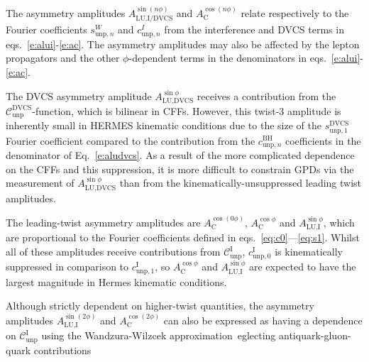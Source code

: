 The asymmetry amplitudes $A_{\textrm{LU,I/DVCS}}^{\sin(n\phi)}$ and
$A_{\textrm{C}}^{\cos(n\phi)}$ relate respectively to the Fourier
coefficients $s_{\textrm{unp},n}^{W}$ and $c_{\textrm{unp},n}^{I}$ from the interference and DVCS terms in eqs.~\ref{e:alui}-\ref{e:ac}. The asymmetry amplitudes
may also be affected by the lepton propagators and the other
$\phi$-dependent terms in the denominators in
eqs.~\ref{e:alui}-\ref{e:ac}.

The DVCS asymmetry amplitude $A^{\sin\phi}_{\textrm{LU,DVCS}}$ receives a
contribution from the $\mathcal{C}_{\textrm{unp}}^{\textrm{DVCS}}$-function,
which is bilinear in CFFs. However, this twist-3 amplitude is inherently small in HERMES kinematic conditions due to the size of the $s_{\textrm{unp},1}^{\textrm{DVCS}}$ Fourier coefficient compared to the contribution from the $c_{\textrm{unp},n}^{\textrm{BH}}$ coefficients in the denominator of Eq.~\ref{e:aludvcs}. As a result of the more complicated dependence on the CFFs and this suppression, it
is more difficult to constrain GPDs via the measurement of $A^{\sin\phi}_{\textrm{LU,DVCS}}$ than from the kinematically-unsuppressed leading twist amplitudes.

The leading-twist asymmetry amplitudes are $A_{\textrm{C}}^{\cos(0\phi)}$, $A_{\textrm{C}}^{\cos\phi}$ and $A_{\textrm{LU,I}}^{\sin\phi}$, which are proportional to the Fourier coefficients  defined in eqs.~\ref{eq:c0}---\ref{eq:s1}. Whilst all of these amplitudes receive contributions from $\mathcal{C}_{\textrm{unp}}^{\textrm{I}}$, $c_{\textrm{unp},0}^{\textrm{I}}$ is kinematically suppressed in comparison to $c_{\textrm{unp},1}^{\textrm{I}}$, so $A_{\textrm{C}}^{\cos\phi}$ and $A_{\textrm{LU,I}}^{\sin\phi}$ are expected to have the largest magnitude in H{\sc ermes} kinematic conditions.

Although strictly dependent on higher-twist quantities, the asymmetry amplitudes $A_{\textrm{LU},\textrm{I}}^{\sin(2\phi)}$ and $A^{\cos(2\phi)}_{\textrm{C}}$ can also be expressed as having a dependence on $\mathcal{C}_{\textrm{unp}}^{\textrm{I}}$ using the Wandzura-Wilzcek approximation~\cite{Wan}eglecting antiquark-gluon-quark contributions

